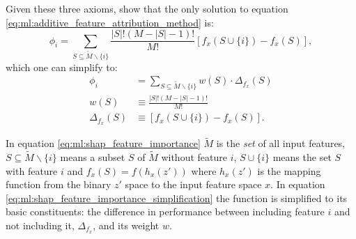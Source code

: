 Given these three axioms, \citet{Lundberg:2017} show that the only solution to equation \eqref{eq:ml:additive_feature_attribution_method} is:
\begin{equation}
  \label{eq:ml:shap_feature_importance}
    \phi_i = \sum_{S \subseteq \widetilde{M} \backslash \{i\}} \frac{|S|!(M-|S|-1)!}{M!} \left[ f_x(S \cup \{i\}) - f_x(S) \right] ,
\end{equation}
which one can simplify to:
\begin{equation}
  \label{eq:ml:shap_feature_importance_simplification}
  \begin{split}
    \phi_i        &= \sum_{S \subseteq \widetilde{M} \backslash \{i\}} w(S) \cdot \Delta_{f_x}(S) \\
    w(S)             &\equiv \frac{|S|!(M-|S|-1)!}{M!} \\
    \Delta_{f_x}(S)  &\equiv \left[ f_x(S \cup \{i\}) - f_x(S) \right].
  \end{split}
\end{equation}


In equation \eqref{eq:ml:shap_feature_importance} $\widetilde{M}$ is the \emph{set} of all input features, $S \subseteq \widetilde{M} \backslash \{i\}$ means a subset $S$ of $\widetilde{M}$ without feature $i$, $S \cup \{i\}$ means the set $S$ with feature $i$ and $f_x(S) = f(h_x(z'))$ where $h_x(z')$ is the mapping function from the binary $z'$ space to the input feature space $x$. In equation \eqref{eq:ml:shap_feature_importance_simplification} the function is simplified to its basic constituents: the difference in performance  between including feature $i$ and not including it, $\Delta_{f_x}$, and its weight $w$. 

